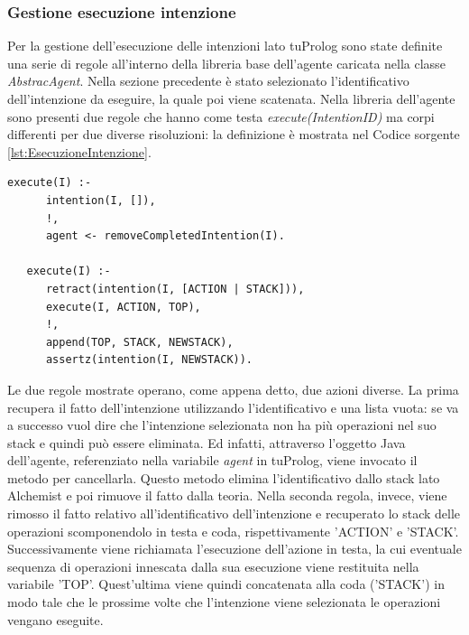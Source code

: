 \documentclass[12pt,a4paper,openright,twoside]{report}
\begin{document}
\subsubsection{Gestione esecuzione intenzione}
Per la gestione dell'esecuzione delle intenzioni lato tuProlog sono state definite una serie di regole all'interno della libreria base dell'agente caricata nella classe \textit{AbstracAgent}.
Nella sezione precedente \`e stato selezionato l'identificativo dell'intenzione da eseguire, la quale poi viene scatenata. Nella libreria dell'agente sono presenti due regole che hanno come testa \textit{execute(IntentionID)} ma corpi differenti per due diverse risoluzioni: la definizione \`e mostrata nel Codice sorgente \ref{lst:EsecuzioneIntenzione}.
\medskip
\begin{lstlisting}[firstnumber=1,label={lst:EsecuzioneIntenzione},caption={Regole per l'esecuzione dell'intenzione}]
   execute(I) :-
      intention(I, []),
      !,
      agent <- removeCompletedIntention(I).

   execute(I) :-
      retract(intention(I, [ACTION | STACK])),
      execute(I, ACTION, TOP),
      !,
      append(TOP, STACK, NEWSTACK),
      assertz(intention(I, NEWSTACK)).
\end{lstlisting}
Le due regole mostrate operano, come appena detto, due azioni diverse. La prima recupera il fatto dell'intenzione utilizzando l'identificativo e una lista vuota: se va a successo vuol dire che l'intenzione selezionata non ha pi\`u operazioni nel suo stack e quindi pu\`o essere eliminata. Ed infatti, attraverso l'oggetto Java dell'agente, referenziato nella variabile \textit{agent} in tuProlog, viene invocato il metodo per cancellarla. Questo metodo elimina l'identificativo dallo stack lato Alchemist e poi rimuove il fatto dalla teoria.
Nella seconda regola, invece, viene rimosso il fatto relativo all'identificativo dell'intenzione e recuperato lo stack delle operazioni scomponendolo in testa e coda, rispettivamente 'ACTION' e 'STACK'. Successivamente viene richiamata l'esecuzione dell'azione in testa, la cui eventuale sequenza di operazioni innescata dalla sua esecuzione viene restituita nella variabile 'TOP'. Quest'ultima viene quindi concatenata alla coda ('STACK') in modo tale che le prossime volte che l'intenzione viene selezionata le operazioni vengano eseguite.
\end{document}
